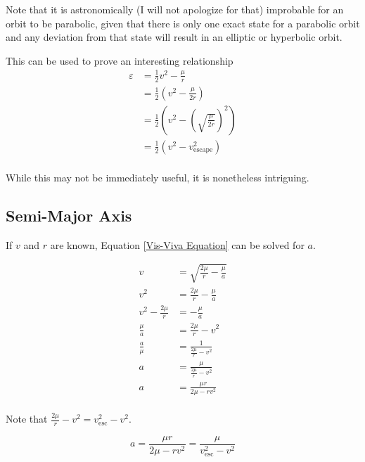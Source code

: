 \documentclass{article}
\begin{document}
Note that it is astronomically (I will not apologize for that) improbable for an orbit to be parabolic, given that there is only one exact state for a parabolic orbit and any deviation from that state will result in an elliptic or hyperbolic orbit.

This can be used to prove an interesting relationship
\begin{align*}
    \varepsilon & = \frac{1}{2}v^2-\frac{\mu}{r}                                     \\
                & = \frac{1}{2}\left(v^2-\frac{\mu}{2r}\right)                       \\
                & = \frac{1}{2}\left(v^2-\left(\sqrt{\frac{\mu}{2r}}\right)^2\right) \\
                & = \frac{1}{2}\left(v^2-v_\text{escape}^2\right)                    \\
\end{align*}

While this may not be immediately useful, it is nonetheless intriguing.

\bigskip\bigskip
\subsection{Semi-Major Axis}\label{sec:SMA in Terms of V,R}

If $v$ and $r$ are known, Equation \eqref{Vis-Viva Equation} can be solved for $a$.

\begin{align*}
    v                  & = \sqrt{\frac{2\mu}{r}-\frac{\mu}{a}} \\
    v^2                & = \frac{2\mu}{r}-\frac{\mu}{a}        \\
    v^2-\frac{2\mu}{r} & =-\frac{\mu}{a}                       \\
    \frac{\mu}{a}      & = \frac{2\mu}{r}-v^2                  \\
    \frac{a}{\mu}      & = \frac{1}{\frac{2\mu}{r}-v^2}        \\
    a                  & = \frac{\mu}{\frac{2\mu}{r}-v^2}      \\
    a                  & = \frac{\mu r}{2\mu-rv^2}             \\
\end{align*}

Note that $\frac{2\mu}{r}-v^2=v_\text{esc}^2-v^2$.

\begin{equation}\label{SMA in terms of r, v}
    a=\frac{\mu r}{2\mu-rv^2}=\frac{\mu}{v_\text{esc}^2-v^2}
\end{equation}
\end{document}
